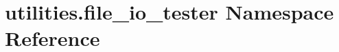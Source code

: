 \hypertarget{namespaceutilities_1_1file__io__tester}{}\section{utilities.\+file\+\_\+io\+\_\+tester Namespace Reference}
\label{namespaceutilities_1_1file__io__tester}

